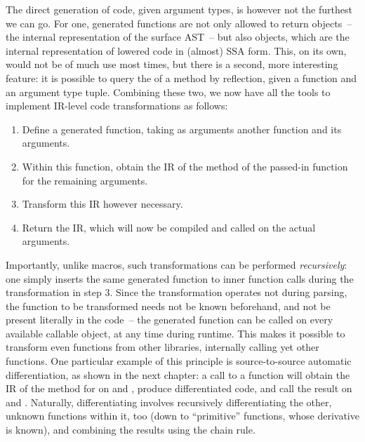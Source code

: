 The direct generation of code, given argument types, is however not the furthest we can go.  For
one, generated functions are not only allowed to return  objects~-- the internal
representation of the surface AST~-- but also  objects, which are the internal
representation of lowered code in (almost) SSA form.  This, on its own, would not be of much use
most times, but there is a second, more interesting feature: it is possible to query the
 of a method by reflection, given a function and an argument type tuple.  Combining
these two, we now have all the tools to implement IR-level code transformations as follows:
\begin{enumerate}
  \firmlist
\item Define a generated function, taking as arguments another function and its arguments.
\item Within this function, obtain the IR of the method of the passed-in function for the remaining
  arguments.
\item Transform this IR however necessary.
\item Return the IR, which will now be compiled and called on the actual arguments.
\end{enumerate}
Importantly, unlike macros, such transformations can be performed \emph{recursively}: one simply
inserts the same generated function to inner function calls during the transformation in step 3.
Since the transformation operates not during parsing, the function to be transformed needs not be
known beforehand, and not be present literally in the code~-- the generated function can be called
on every available callable object, at any time during runtime.  This makes it possible to transform
even functions from other libraries, internally calling yet other functions.  One particular example
of this principle is source-to-source automatic differentiation, as shown in the next chapter: a
call to a function  will obtain the IR of the method for  on
 and , produce differentiated code, and call the result on
 and .  Naturally, differentiating  involves recursively differentiating
the other, unknown functions within it, too (down to \enquote{primitive} functions, whose derivative
is known), and combining the results using the chain rule.

